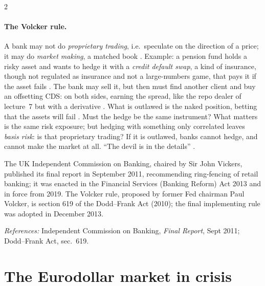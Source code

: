 \begin{paracol}{2}
\paragraph{The Volcker rule.} A bank may not do \emph{proprietary trading}, i.e.\ speculate on the direction of a price; it may do \emph{market making},
a matched book . Example: a pension fund holds a risky asset and wants to hedge it with a \emph{credit default swap}, a kind of
insurance, though not regulated as insurance and not a large-numbers game, that pays it if the asset fails .
The bank may sell it, but then must find another client and buy an offsetting CDS: on both sides, earning the spread, like the repo dealer of lecture~7 but with a
derivative . What is outlawed is the naked position, betting that the assets will fail .
Must the hedge be the same instrument? What matters is the same risk exposure; but hedging with something only correlated leaves \emph{basis risk}: is that
proprietary trading? If it is outlawed, banks cannot hedge, and cannot make the market at all. ``The devil is in the details'' .
\begin{taccts}
\quad
{}\quad
{}
\end{taccts}\begin{history}
The UK Independent Commission on Banking, chaired by Sir John Vickers, published its final report in September 2011, recommending ring-fencing of retail
banking; it was enacted in the Financial Services (Banking Reform) Act 2013 and in force from 2019. The Volcker rule, proposed by former Fed chairman Paul
Volcker, is section 619 of the Dodd--Frank Act (2010); the final implementing rule was adopted in December 2013.\par
\emph{References:} Independent Commission on Banking, \emph{Final Report}, Sept 2011; Dodd--Frank Act, sec.~619.
\end{history}

\section{The Eurodollar market in crisis}\label{sec:ed-crisis}


\end{paracol}
